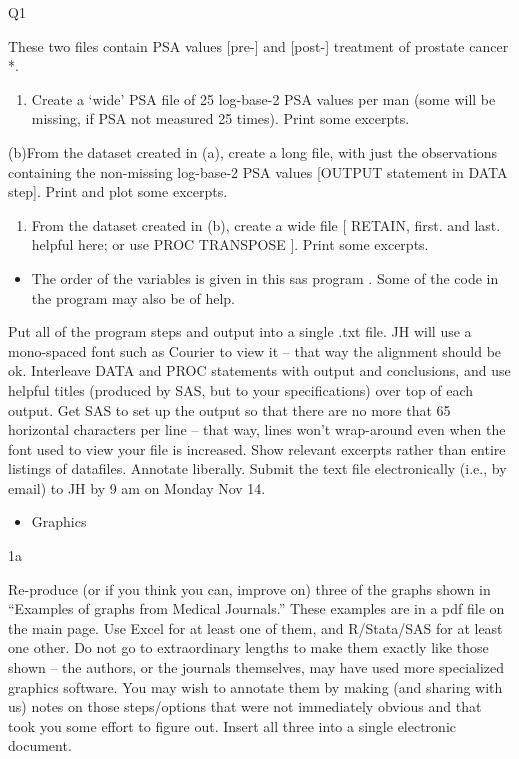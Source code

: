 \documentclass[]{book}
\providecommand{\tightlist}{%
  \setlength{\itemsep}{0pt}\setlength{\parskip}{0pt}}
\begin{document}
Q1

These two files contain PSA values {[}pre-{]} and {[}post-{]} treatment of prostate cancer *.

\begin{enumerate}
\def\labelenumi{(\alph{enumi})}
\tightlist
\item
  Create a `wide' PSA file of 25 log-base-2 PSA values per man (some will be missing, if PSA not measured 25 times). Print some excerpts.
\end{enumerate}

(b)From the dataset created in (a), create a long file, with just the observations containing the non-missing log-base-2 PSA values {[}OUTPUT statement in DATA step{]}. Print and plot some excerpts.

\begin{enumerate}
\def\labelenumi{(\alph{enumi})}
\setcounter{enumi}{2}
\tightlist
\item
  From the dataset created in (b), create a wide file {[} RETAIN, first. and last. helpful here; or use PROC TRANSPOSE {]}. Print some excerpts.
\end{enumerate}

\begin{itemize}
\tightlist
\item
  The order of the variables is given in this sas program . Some of the code in the program may also be of help.
\end{itemize}

Put all of the program steps and output into a single .txt file. JH will use a mono-spaced font such as Courier to view it -- that way the alignment should be ok. Interleave DATA and PROC statements with output and conclusions, and use helpful titles (produced by SAS, but to your specifications) over top of each output. Get SAS to set up the output so that there are no more that 65 horizontal characters per line -- that way, lines won't wrap-around even when the font used to view your file is increased. Show relevant excerpts rather than entire listings of datafiles. Annotate liberally. Submit the text file electronically (i.e., by email) to JH by 9 am on Monday Nov 14.

\begin{itemize}
\tightlist
\item
  Graphics
\end{itemize}

1a

Re-produce (or if you think you can, improve on) three of the graphs shown in ``Examples of graphs from Medical Journals.'' These examples are in a pdf file on the main page. Use Excel for at least one of them, and R/Stata/SAS for at least one other. Do not go to extraordinary lengths to make them exactly like those shown -- the authors, or the journals themselves, may have used more specialized graphics software. You may wish to annotate them by making (and sharing with us) notes on those steps/options that were not immediately obvious and that took you some effort to figure out. Insert all three into a single electronic document.
\end{document}
